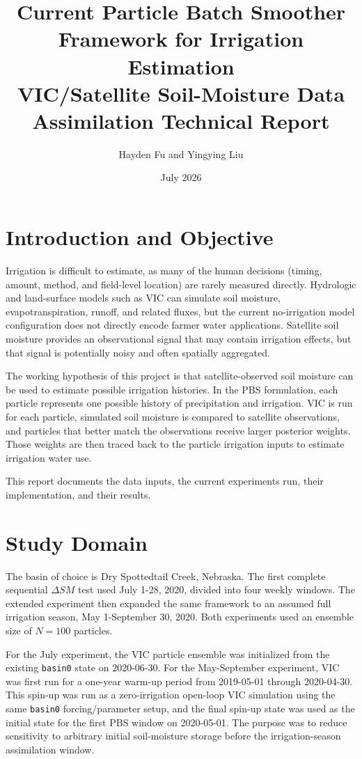 \documentclass[11pt]{article}
\title{Current Particle Batch Smoother Framework for Irrigation Estimation\\
\large VIC/Satellite Soil-Moisture Data Assimilation Technical Report}
\author{Hayden Fu and Yingying Liu}
\date{July 2026}
\newcommand{\code}[1]{\texttt{#1}}
\begin{document}
\maketitle

\newpage

\tableofcontents

\newpage

\section{Introduction and Objective}

Irrigation is difficult to estimate, as many of the human decisions (timing, amount, method, and field-level location) are rarely measured directly. Hydrologic and land-surface models such as VIC can simulate soil moisture, evapotranspiration, runoff, and related fluxes, but the current no-irrigation model configuration does not directly encode farmer water applications. Satellite soil moisture provides an observational signal that may contain irrigation effects, but that signal is potentially noisy and often spatially aggregated.

The working hypothesis of this project is that satellite-observed soil moisture can be used to estimate possible irrigation histories. In the PBS formulation, each particle represents one possible history of precipitation and irrigation. VIC is run for each particle, simulated soil moisture is compared to satellite observations, and particles that better match the observations receive larger posterior weights. Those weights are then traced back to the particle irrigation inputs to estimate irrigation water use.

This report documents the data inputs, the current experiments run, their implementation, and their results.

\section{Study Domain}

The basin of choice is Dry Spottedtail Creek, Nebraska. The first complete sequential $\Delta SM$ test used July 1-28, 2020, divided into four weekly windows. The extended experiment then expanded the same framework to an assumed full irrigation season, May 1-September 30, 2020. Both experiments used an ensemble size of $N=100$ particles.

For the July experiment, the VIC particle ensemble was initialized from the existing \code{basin0} state on 2020-06-30. For the May-September experiment, VIC was first run for a one-year warm-up period from 2019-05-01 through 2020-04-30. This spin-up was run as a zero-irrigation open-loop VIC simulation using the same \code{basin0} forcing/parameter setup, and the final spin-up state was used as the initial state for the first PBS window on 2020-05-01. The purpose was to reduce sensitivity to arbitrary initial soil-moisture storage before the irrigation-season assimilation window.
\end{document}
